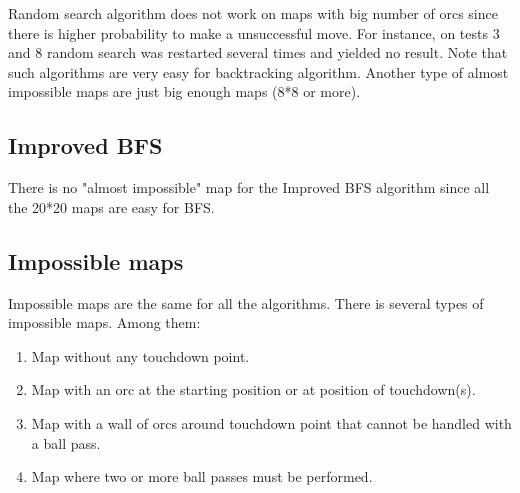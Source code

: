 \documentclass{article}
\begin{document}
Random search algorithm does not work on maps with big number of orcs since there is higher probability to make a unsuccessful move. For instance, on tests 3 and 8 random search was restarted several times and yielded no result. Note that such algorithms are very easy for backtracking algorithm. Another type of almost impossible maps are just big enough maps (8*8 or more). 
\subsection{Improved BFS}
There is no "almost impossible" map for the Improved BFS algorithm since all the 20*20 maps are easy for BFS.
\subsection{Impossible maps}
Impossible maps are the same for all the algorithms. There is several types of impossible maps. Among them:
\begin{enumerate}
	\item Map without any touchdown point.
	\item Map with an orc at the starting position or at position of touchdown(s).
	\item Map with a wall of orcs around touchdown point that cannot be handled with a ball pass.
	\item Map where two or more ball passes must be performed.
\end{enumerate}
\end{document}
